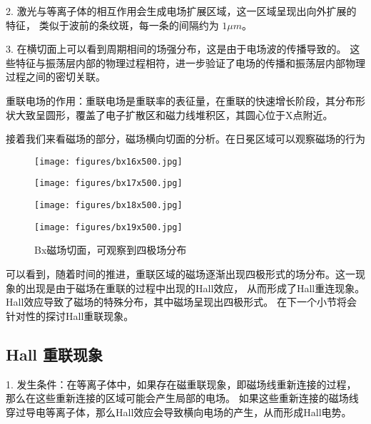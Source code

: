 2. 激光与等离子体的相互作用会生成电场扩展区域，这一区域呈现出向外扩展的特征，
类似于波前的条纹斑，每一条的间隔约为 $1 \mu m$。

3. 在横切面上可以看到周期相间的场强分布，这是由于电场波的传播导致的。
这些特征与振荡层内部的物理过程相符，进一步验证了电场的传播和振荡层内部物理过程之间的密切关联。



重联电场的作用：重联电场是重联率的表征量，在重联的快速增长阶段，其分布形状大致呈圆形，覆盖了电子扩散区和磁力线堆积区，其圆心位于X点附近。


接着我们来看磁场的部分，磁场横向切面的分析。在日冕区域可以观察磁场的行为

\begin{figure}[H]
    \begin{minipage}[t]{0.5\linewidth}
        \centering
        \texttt{[image: figures/bx16x500.jpg]}
        \label{fig:sideB:a}
    \end{minipage}%
    \begin{minipage}[t]{0.5\linewidth}
        \centering
        \texttt{[image: figures/bx17x500.jpg]}
        \label{fig:sideB:b}
    \end{minipage}
    \begin{minipage}[t]{0.5\linewidth}
        \centering
        \texttt{[image: figures/bx18x500.jpg]}
        \label{fig:sideB:c}
    \end{minipage}%
    \begin{minipage}[t]{0.5\linewidth}
        \centering
        \texttt{[image: figures/bx19x500.jpg]}
        \label{fig:sideB:d}
    \end{minipage}
    \caption{Bx磁场切面，可观察到四极场分布}
    \label{fig:combinedB}

\end{figure}


可以看到，随着时间的推进，重联区域的磁场逐渐出现四极形式的场分布。这一现象的出现是由于磁场在重联的过程中出现的Hall效应，
从而形成了Hall重连现象。Hall效应导致了磁场的特殊分布，其中磁场呈现出四极形式。
在下一个小节将会针对性的探讨Hall重联现象。

\subsection[\textnormal{Hall 重联现象}]{\textbf{Hall 重联现象}}

1. 发生条件：在等离子体中，如果存在磁重联现象，即磁场线重新连接的过程，那么在这些重新连接的区域可能会产生局部的电场。
如果这些重新连接的磁场线穿过导电等离子体，那么Hall效应会导致横向电场的产生，从而形成Hall电势。

